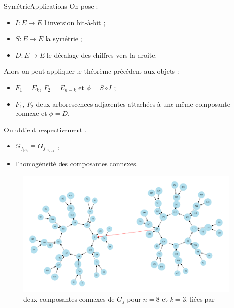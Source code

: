 \begin{frame}{Sym\'etrie}{Applications}
On pose :
\begin{itemize}
\item $I:E\rightarrow E$ l'inversion bit-\`a-bit ;
\item $S:E\rightarrow E$ la sym\'etrie ;
\item $D:E\rightarrow E$ le d\'ecalage des chiffres vers la droite.
\end{itemize}
Alors on peut appliquer le th\'eor\`eme pr\'ec\'edent aux objets :
\begin{itemize}
\item $F_{1}=E_{k}$, $F_{2}=E_{n-k}$ et $\phi=S\circ I$ ;
\item $F_{1}$, $F_{2}$ deux arborescences adjacentes attach\'ees \`a une m\^eme composante connexe et $\phi=D$.
\end{itemize}
On obtient respectivement :
\begin{itemize}
\item $G_{f_{|E_{k}}}\equiv G_{f_{|E_{n-k}}}$ ;
\item l'homog\'en\'eit\'e des composantes connexes.
\end{itemize}
\end{frame}

\begin{frame}
\begin{figure}
\includegraphics[scale=0.25]{./images/graph_sym1}
\caption{deux composantes connexes de $G_f$ pour $n=8$ et $k=3$, li\'ees par \color{red}{$\phi=S\circ I$}}
\end{figure}
\end{frame}

